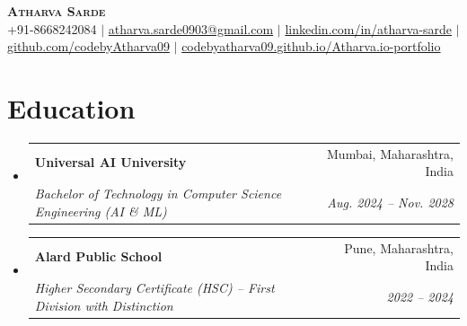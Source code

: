 \documentclass[letterpaper,10pt]{article}
\makeatletter
\newcommand{\resumeSubheading}[4]{
  \vspace{-2pt}\item
    \begin{tabular*}{0.97\textwidth}[t]{l@{\extracolsep{\fill}}r}
      \textbf{#1} & #2 \\
      \textit{\small#3} & \textit{\small #4} \\
    \end{tabular*}\vspace{-7pt}
}
\newcommand{\resumeSubHeadingListStart}{\begin{itemize}[leftmargin=0.15in, label={}]}
\newcommand{\resumeSubHeadingListEnd}{\end{itemize}}
\makeatother
\begin{document}
\begin{center}
    \textbf{\Huge \scshape Atharva Sarde} \\ \vspace{1pt}
    \small +91-8668242084 $|$ \href{mailto:atharva.sarde0903@gmail.com}{atharva.sarde0903@gmail.com} $|$
    \href{https://www.linkedin.com/in/atharva-sarde/}{linkedin.com/in/atharva-sarde} $|$
    \href{https://github.com/codebyAtharva09}{github.com/codebyAtharva09} $|$
    \href{https://codebyatharva09.github.io/Atharva.io-portfolio/}{codebyatharva09.github.io/Atharva.io-portfolio}
\end{center}

\section{Education}
  \resumeSubHeadingListStart
    \resumeSubheading
      {Universal AI University}{Mumbai, Maharashtra, India}
      {Bachelor of Technology in Computer Science Engineering (AI \& ML)}{Aug. 2024 -- Nov. 2028}
    \resumeSubheading
      {Alard Public School}{Pune, Maharashtra, India}
      {Higher Secondary Certificate (HSC) -- First Division with Distinction}{2022 -- 2024}
  \resumeSubHeadingListEnd

\end{document}
